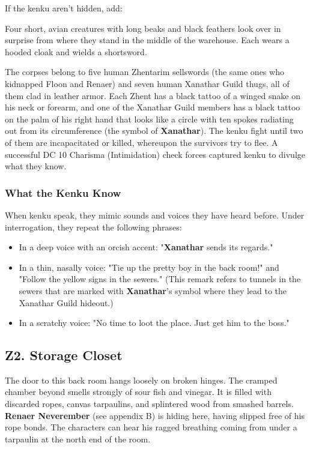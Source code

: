 \documentclass[10pt,a4paper,twoside,twocolumn,openany,nodeprecatedcode]{dndbook}
\begin{document}
If the kenku aren't hidden, add:
\begin{DndReadAloud}{}
Four short, avian creatures with long beaks and black feathers look over in surprise from where they stand in the middle of the warehouse. Each wears a hooded cloak and wields a shortsword.
\end{DndReadAloud}

The corpses belong to five human Zhentarim sellswords (the same ones who kidnapped Floon and Renaer) and seven human Xanathar Guild thugs, all of them clad in leather armor. Each Zhent has a black tattoo of a winged snake on his neck or forearm, and one of the Xanathar Guild members has a black tattoo on the palm of his right hand that looks like a circle with ten spokes radiating out from its circumference (the symbol of \textbf{Xanathar}).
The kenku fight until two of them are incapacitated or killed, whereupon the survivors try to flee. A successful DC 10 Charisma (Intimidation) check forces captured kenku to divulge what they know.
\subsubsection{What the Kenku Know}
When kenku speak, they mimic sounds and voices they have heard before. Under interrogation, they repeat the following phrases:
\begin{itemize}

\item In a deep voice with an orcish accent: "\textbf{Xanathar} sends its regards."
\item In a thin, nasally voice: "Tie up the pretty boy in the back room!" and "Follow the yellow signs in the sewers." (This remark refers to tunnels in the sewers that are marked with \textbf{Xanathar}'s symbol where they lead to the Xanathar Guild hideout.)
\item In a scratchy voice: "No time to loot the place. Just get him to the boss."
\end{itemize}


\subsection{Z2. Storage Closet}
The door to this back room hangs loosely on broken hinges. The cramped chamber beyond smells strongly of sour fish and vinegar. It is filled with discarded ropes, canvas tarpaulins, and splintered wood from smashed barrels. \textbf{Renaer Neverember} (see appendix B) is hiding here, having slipped free of his rope bonds. The characters can hear his ragged breathing coming from under a tarpaulin at the north end of the room.
\end{document}
